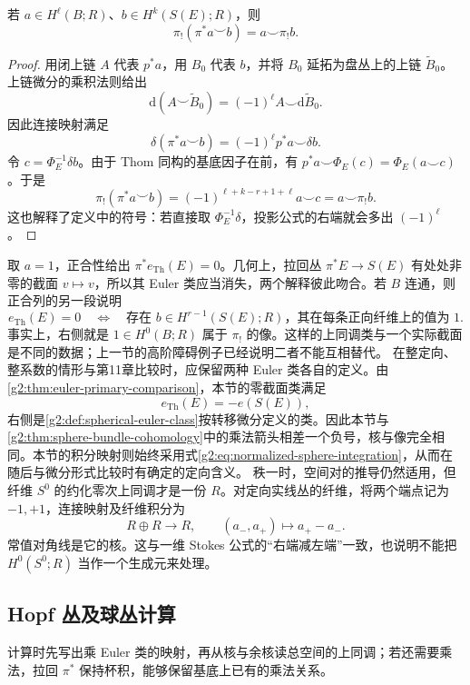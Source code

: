 \begin{proposition}\label{g2:prop:gysin-projection}
	若 \(a\in H^\ell(B;R)\)、\(b\in H^k(S(E);R)\)，则
	\begin{equation}\label{g2:eq:gysin-projection-formula}
		\pi_!(\pi^*a\smile b)=a\smile\pi_!b.
	\end{equation}
\end{proposition}
\begin{proof}
	用闭上链 \(A\) 代表 \(p^*a\)，用 \(B_0\) 代表 \(b\)，并将 \(B_0\) 延拓为盘丛上的上链 \(\widetilde B_0\)。上链微分的乘积法则给出
	\[
		\mathrm d(A\smile\widetilde B_0)=(-1)^\ell A\smile\mathrm d\widetilde B_0.
	\]
	因此连接映射满足
	\[
		\delta(\pi^*a\smile b)=(-1)^\ell p^*a\smile\delta b.
	\]
	令 \(c=\Phi_E^{-1}\delta b\)。由于 Thom 同构的基底因子在前，有 \(p^*a\smile\Phi_E(c)=\Phi_E(a\smile c)\)。于是
	\[
		\pi_!(\pi^*a\smile b)=(-1)^{\ell+k-r+1+\ell}a\smile c=a\smile\pi_!b.
	\]
	这也解释了定义中的符号：若直接取 \(\Phi_E^{-1}\delta\)，投影公式的右端就会多出 \((-1)^\ell\)。
\end{proof}

取 \(a=1\)，正合性给出 \(\pi^*e_{\mathrm{Th}}(E)=0\)。几何上，拉回丛 \(\pi^*E\to S(E)\) 有处处非零的截面 \(v\mapsto v\)，所以其 Euler 类应当消失，两个解释彼此吻合。若 \(B\) 连通，则正合列的另一段说明
\begin{equation}\label{g2:eq:gysin-extend-fiber-generator}
	e_{\mathrm{Th}}(E)=0
	\quad\Longleftrightarrow\quad
	\text{存在 }b\in H^{r-1}(S(E);R)\text{，其在每条正向纤维上的值为 }1.
\end{equation}
事实上，右侧就是 \(1\in H^0(B;R)\) 属于 \(\pi_!\) 的像。这样的上同调类与一个实际截面是不同的数据；上一节的高阶障碍例子已经说明二者不能互相替代。
\ProseParagraphBreak
在整定向、整系数的情形与第11章比较时，应保留两种 Euler 类各自的定义。由\cref{g2:thm:euler-primary-comparison}，本节的零截面类满足
\[
	e_{\mathrm{Th}}(E)=-e(S(E)),
\]
右侧是\cref{g2:def:spherical-euler-class}按转移微分定义的类。因此本节与\cref{g2:thm:sphere-bundle-cohomology}中的乘法箭头相差一个负号，核与像完全相同。本节的积分映射则始终采用式\eqref{g2:eq:normalized-sphere-integration}，从而在随后与微分形式比较时有确定的定向含义。
\ProseParagraphBreak
秩一时，空间对的推导仍然适用，但纤维 \(S^0\) 的约化零次上同调才是一份 \(R\)。对定向实线丛的纤维，将两个端点记为 \(-1,+1\)，连接映射及纤维积分为
\[
	R\oplus R\longrightarrow R,\qquad (a_-,a_+)\longmapsto a_+-a_-.
\]
常值对角线是它的核。这与一维 Stokes 公式的“右端减左端”一致，也说明不能把 \(H^0(S^0;R)\) 当作一个生成元来处理。

\subsection{Hopf 丛及球丛计算}
\label{g2:subsec:2004:03}
计算时先写出乘 Euler 类的映射，再从核与余核读总空间的上同调；若还需要乘法，拉回 \(\pi^*\) 保持杯积，能够保留基底上已有的乘法关系。


